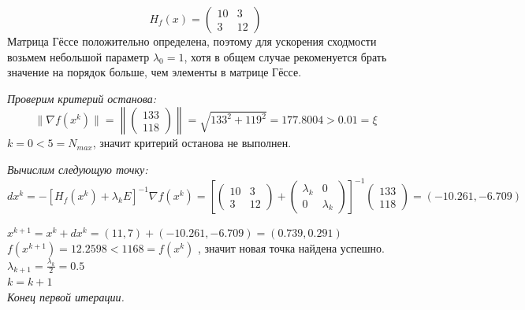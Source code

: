 \begin{itemize}
    \begin{equation*}
    H_{f}(x) = \left(
    \begin{array}{cccc}
        10 & 3 \\
        3 & 12
    \end{array}
    \right)
    \end{equation*}
    Матрица Гёссе положительно определена, поэтому для ускорения сходмости возьмем небольшой параметр $\lambda_0 = 1$, хотя в общем случае рекоменуется брать значение на порядок больше, чем элементы в матрице Гёссе.
    
    
    {\it Проверим критерий останова:}
    \begin{equation*}
    \|\nabla f(x^k)\| = \left\|\left(
    \begin{array}{cccc}
        133\\
        118
    \end{array}
    \right)\right\| = \sqrt{133^2 + 119^2} = 177.8004 > 0.01 = \xi
    \end{equation*}
    $k = 0 < 5 = N_{max}$, значит критерий останова не выполнен.
    
    {\it Вычислим следующую точку:}
    \begin{equation*}
    dx^k = -[H_{f}(x^k) + \lambda_k E]^{-1} \nabla f(x^k) = \left[
    \left(
    \begin{array}{cccc}
        10 & 3 \\
        3 & 12
    \end{array}
    \right) 
    + 
    \left(
    \begin{array}{cccc}
        \lambda_k & 0 \\
        0 & \lambda_k
    \end{array}
    \right)
    \right]^{-1} 
    \left(
    \begin{array}{cccc}
        133 \\
        118
    \end{array}
    \right) 
    = 
    \left(
        -10.261, -6.709
    \right)
    \end{equation*}
    
    $x^{k+1} = x^k + dx^k = (11, 7) + (-10.261, -6.709) = (0.739, 0.291)$\\
    $f(x^{k+1}) = 12.2598 < 1168 = f(x^k)$ , значит новая точка найдена успешно. \\
    $\lambda_{k+1} = \displaystyle\frac{\lambda_k}{2} = 0.5$ \\
    $k = k + 1$ \\
    {\it Конец первой итерации.}
    

\end{itemize}
